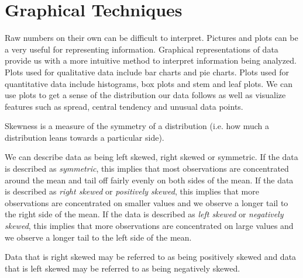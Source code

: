 \section{Graphical Techniques}


Raw numbers on their own can be difficult to interpret.
Pictures and plots can be a very useful for representing information. Graphical representations of data provide us with a more intuitive method to
interpret information being analyzed.\\

Plots used for qualitative data include bar charts and pie charts.
Plots used for quantitative data include histograms, box plots and stem and leaf plots.
We can use plots to get a sense of the distribution our data follows as well
as visualize features such as spread, central tendency and unusual data points.

\begin{definition}[Skewness]	
Skewness is a measure of the symmetry of a distribution (i.e. how much a distribution leans towards a particular side).
\end{definition}

We can describe data as being left skewed, right skewed or symmetric. If the data is described as \textit{symmetric}, this implies that most observations are concentrated around the mean and tail off fairly evenly on both sides of the mean. If the data is described as \textit{right skewed} or \textit{positively skewed}, this implies that more observations are concentrated on smaller values and we observe a longer tail to the right side of the mean. If the data is described as \textit{left skewed} or \textit{negatively skewed}, this implies that more observations are concentrated on large values and we observe a longer tail to the left side of the mean.

\begin{nt}
Data that is right skewed may be referred to as being positively skewed and data that is left skewed may be referred to as being negatively skewed.
\end{nt}

